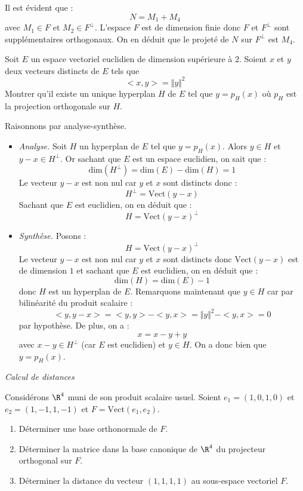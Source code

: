 \documentclass[a4paper,10pt]{report}
\begin{document}
\begin{enumerate}
\medskip

\noindent Il est évident que :
$$ N= M_1+M_4$$
avec $M_1 \in F$ et $M_2 \in F^{\perp}$. L'espace $F$ est de dimension finie donc $F$ et $F^{\perp}$ sont supplémentaires orthogonaux. On en déduit que le projeté de $N$ sur $F^{\perp}$ est $M_4$.
\end{enumerate}

\begin{Exa} Soit $E$ un espace vectoriel euclidien de dimension supérieure à $2$.  Soient $x$ et $y$ deux vecteurs distincts de $E$ tels que $$< x, y> =\Vert y \Vert^{2}$$
 Montrer qu'il existe un unique hyperplan $H$ de $E$ tel que $y = p_{H}(x)$ où $p_H$ est la projection orthogonale sur $H$.
 \end{Exa}
 
 \corr Raisonnons par analyse-synthèse.
 
 \begin{itemize}
 \item \textit{Analyse.} Soit $H$ un hyperplan de $E$ tel que $y = p_{H}(x)$. Alors $y \in H$ et $y-x \in H^{\perp}$. Or sachant que $E$ est un espace euclidien, on sait que :
 $$ \textrm{dim}(H^{\perp})= \textrm{dim}(E) - \textrm{dim}(H)=1$$
 Le vecteur $y-x$ est non nul car $y$ et $x$ sont distincts donc :
 $$ H^{\perp}= \textrm{Vect}(y-x)$$
 Sachant que $E$ est euclidien, on en déduit que :
 $$ H = \textrm{Vect}(y-x)^{\perp}$$
 \item \textit{Synthèse.} Posons :
 $$ H = \textrm{Vect}(y-x)^{\perp}$$
 Le vecteur $y-x$ est non nul car $y$ et $x$ sont distincts donc $ \textrm{Vect}(y-x)$ est de dimension $1$ et sachant que $E$ est euclidien, on en déduit que :
 $$ \textrm{dim}(H) = \textrm{dim}(E) - 1 $$
 donc $H$ est un hyperplan de $E$. Remarquons maintenant que $y \in H$ car par bilinéarité du produit scalaire :
 $$ <y,y-x> = <y,y>-<y,x>= \Vert y \Vert^2 - <y,x>= 0$$
 par hypothèse. De plus, on a :
 $$ x=x-y+y$$
 avec $x-y \in H^{\perp}$ (car $E$ est euclidien) et $y \in H$. On a donc bien que $y = p_H(x)$.
\end{itemize}



\medskip

\begin{center}
\textit{{ {\large Calcul de distances}}}
\end{center}

\medskip

\begin{Exa} Considérons $\R^4$ muni de son produit scalaire usuel. Soient $e_1=(1,0,1,0)$ et $e_2=(1,-1,1,-1)$ et $F=\textrm{Vect}(e_1,e_2)$.
\begin{enumerate}
    \item  D\'eterminer une base orthonormale de $F.$
    \item  D\'eterminer la matrice dans la base canonique de $\R^4$ du projecteur orthogonal
sur $F.$
    \item  D\'eterminer la distance du vecteur $(1,1,1,1)$ au sous-espace vectoriel  $F.$
\end{enumerate}
\end{Exa}
\end{document}
